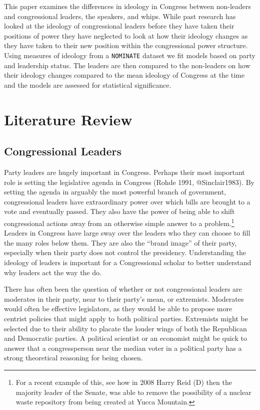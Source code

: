 \documentclass[12pt,twoside]{reedthesis}
\begin{document}
  This paper examines the differences in ideology in Congress between
  non-leaders and congressional leaders, the speakers, and whips. While
  past research has looked at the ideology of congressional leaders before
  they have taken their positions of power they have neglected to look at
  how their ideology changes as they have taken to their new position
  within the congressional power structure. Using measures of ideology
  from a \texttt{NOMINATE} dataset we fit models based on party and
  leadership status. The leaders are then compared to the non-leaders on
  how their ideology changes compared to the mean ideology of Congress at
  the time and the models are assessed for statistical significance.
  
  \chapter{Literature Review}\label{literature-review}
  
  \section{Congressional Leaders}\label{congressional-leaders}
  
  Party leaders are hugely important in Congress. Perhaps their most
  important role is setting the legislative agenda in Congress (Rohde
  1991, @Sinclair1983). By setting the agenda in arguably the most
  powerful branch of government, congressional leaders have extraordinary
  power over which bills are brought to a vote and eventually passed. They
  also have the power of being able to shift congressional actions away
  from an otherwise simple answer to a problem.\footnote{For a recent
    example of this, see how in 2008 Harry Reid (D) then the majority
    leader of the Senate, was able to remove the possibility of a nuclear
    waste repository from being created at Yucca Mountain.} Leaders in
  Congress have large sway over the leaders who they can choose to fill
  the many roles below them. They are also the ``brand image'' of their
  party, especially when their party does not control the presidency.
  Understanding the ideology of leaders is important for a Congressional
  scholar to better understand why leaders act the way the do.
  
  There has often been the question of whether or not congressional
  leaders are moderates in their party, near to their party's mean, or
  extremists. Moderates would often be effective legislators, as they
  would be able to propose more centrist policies that might apply to both
  political parties. Extremists might be selected due to their ability to
  placate the louder wings of both the Republican and Democratic parties.
  A political scientist or an economist might be quick to answer that a
  congressperson near the median voter in a political party has a strong
  theoretical reasoning for being chosen.
  
\end{document}
